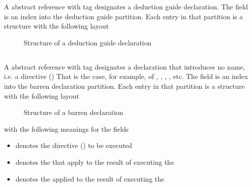 A  abstract reference with tag  designates
a deduction guide declaration.  The  field is an index into the 
deduction guide partition.  Each entry in that partition is a structure with the 
following layout
%
\begin{figure}[H]
	\centering
	\caption{Structure of a deduction guide declaration}
	\label{fig:ifc-deduction-guide-decl-structure}
\end{figure}



\subsection{}
\label{sec:ifc:DeclSort:Barren}

A  abstract reference with tag  designates
a declaration that introduces no name, i.e. a directive () That is
the case, for example, of 
, , , , etc.
The  field is an index into the barren declaration partition.  Each entry
in that partition is a structure with the following layout
%
\begin{figure}[H]
	\centering
	\caption{Structure of a barren declaration}
	\label{fig:ifc:DeclSort:Barren}
\end{figure}
%
with the following meanings for the fields
\begin{itemize}
	\item {} denotes the directive () to be executed
	\item {} denotes the  that apply to the result of executing the 
	\item {} denotes the  applied to the result of executing the 
\end{itemize}

